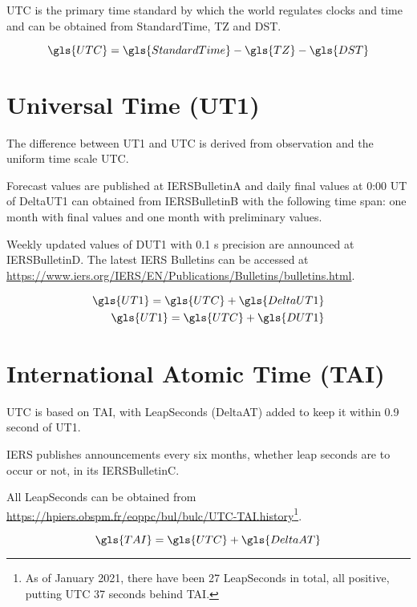 \documentclass[a4paper,11pt,bibliography=totoc]{scrreport}
\begin{document}
\gls{UTC} is the primary time standard by which the world regulates clocks and time and can be obtained from \gls{StandardTime}, \gls{TZ} and \gls{DST}.

\begin{equation}
	\gls{UTC} = \gls{StandardTime} - \gls{TZ} - \gls{DST}	
\end{equation}

\section{Universal Time (UT1)}\label{UT1}

The difference between \gls{UT1} and \gls{UTC} is derived from observation and the uniform time
scale \gls{UTC}. 

Forecast values are published at \gls{IERSBulletinA} and daily final values at 0:00 UT of \gls{DeltaUT1} can obtained from \gls{IERSBulletinB} with the following time span: one month with final values and one month with preliminary values. 

Weekly updated values of \gls{DUT1} with 0.1 s precision are announced at \gls{IERSBulletinD}. The latest \gls{IERS} Bulletins can be accessed at \url{https://www.iers.org/IERS/EN/Publications/Bulletins/bulletins.html}.

\begin{align}
	\gls{UT1} = \gls{UTC} + \gls{DeltaUT1}	\\
	\gls{UT1} = \gls{UTC} + \gls{DUT1}
\end{align}

\section{International Atomic Time (TAI)}\label{TAI}

\gls{UTC} is based on \gls{TAI}, with \glspl{LeapSecond} (\gls{DeltaAT}) added to keep it within 0.9 second of \gls{UT1}. 

\gls{IERS} publishes announcements every six months, whether leap seconds are to occur or not, in its \gls{IERSBulletinC}. 

All \glspl{LeapSecond} can be obtained from \url{https://hpiers.obspm.fr/eoppc/bul/bulc/UTC-TAI.history}\footnote{As of January 2021, there have been 27 \glspl{LeapSecond} in total, all positive, putting \gls{UTC} 37 seconds behind \gls{TAI}.}.

\begin{equation}
	\gls{TAI} = \gls{UTC} + \gls{DeltaAT}
\end{equation}
\end{document}
